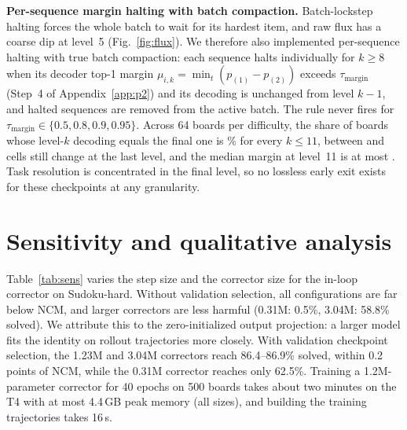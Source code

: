 \textbf{Per-sequence margin halting with batch compaction.} Batch-lockstep halting forces the whole batch to wait for its hardest item, and raw flux has a coarse dip at level~5 (Fig.~\ref{fig:flux}). We therefore also implemented per-sequence halting with true batch compaction: each sequence halts individually for $k\ge8$ when its decoder top-1 margin $\mu_{i,k}=\min_t(p_{(1)}-p_{(2)})$ exceeds $\tau_{\mathrm{margin}}$ (Step~4 of Appendix~\ref{app:p2}) and its decoding is unchanged from level $k-1$, and halted sequences are removed from the active batch. The rule never fires for $\tau_{\mathrm{margin}}\in\{0.5,0.8,0.9,0.95\}$. Across 64 boards per difficulty, the share of boards whose level-$k$ decoding equals the final one is \MarginEqMax\% for every $k\le11$, between \FlipsMin{} and \FlipsMax{} cells still change at the last level, and the median margin at level~11 is at most \MarginMedMax. Task resolution is concentrated in the final level, so no lossless early exit exists for these checkpoints at any granularity.

\section{Sensitivity and qualitative analysis}
\label{app:sens}



Table~\ref{tab:sens} varies the step size and the corrector size for the in-loop corrector on Sudoku-hard. Without validation selection, all configurations are far below NCM, and larger correctors are less harmful (0.31M: 0.5\%, 3.04M: 58.8\% solved). We attribute this to the zero-initialized output projection: a larger model fits the identity on rollout trajectories more closely. With validation checkpoint selection, the 1.23M and 3.04M correctors reach 86.4--86.9\% solved, within 0.2 points of NCM, while the 0.31M corrector reaches only 62.5\%. Training a 1.2M-parameter corrector for 40 epochs on 500 boards takes about two minutes on the T4 with at most 4.4\,GB peak memory (all sizes), and building the training trajectories takes 16\,s.



